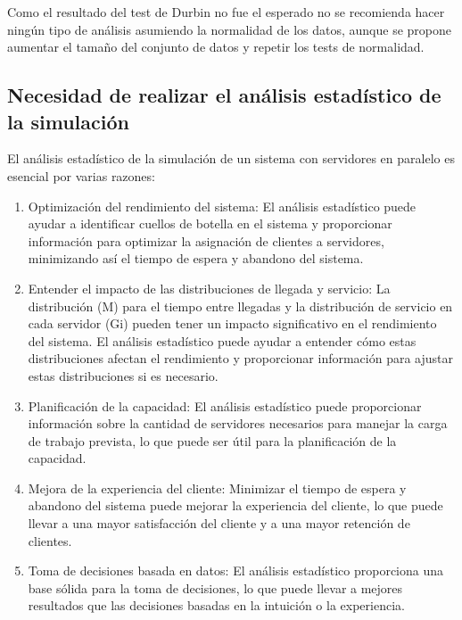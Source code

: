 \documentclass[12pt]{article}
\begin{document}
Como el resultado del test de Durbin no fue el esperado no se recomienda hacer ningún tipo de análisis asumiendo la normalidad de los datos, aunque se propone aumentar el tamaño del conjunto de datos y repetir los tests de normalidad.

\subsection{Necesidad de realizar el análisis estadístico de la simulación}
El análisis estadístico de la simulación de un sistema con servidores en paralelo es esencial por varias razones:
\begin{enumerate}
\item Optimización del rendimiento del sistema: El análisis estadístico puede ayudar a identificar cuellos de botella en el sistema y proporcionar información para optimizar la asignación de clientes a servidores, minimizando así el tiempo de espera y abandono del sistema.
\item Entender el impacto de las distribuciones de llegada y servicio: La distribución (M) para el tiempo entre llegadas y la distribución de servicio en cada servidor (Gi) pueden tener un impacto significativo en el rendimiento del sistema. El análisis estadístico puede ayudar a entender cómo estas distribuciones afectan el rendimiento y proporcionar información para ajustar estas distribuciones si es necesario.
\item Planificación de la capacidad: El análisis estadístico puede proporcionar información sobre la cantidad de servidores necesarios para manejar la carga de trabajo prevista, lo que puede ser útil para la planificación de la capacidad.
\item Mejora de la experiencia del cliente: Minimizar el tiempo de espera y abandono del sistema puede mejorar la experiencia del cliente, lo que puede llevar a una mayor satisfacción del cliente y a una mayor retención de clientes.
\item Toma de decisiones basada en datos: El análisis estadístico proporciona una base sólida para la toma de decisiones, lo que puede llevar a mejores resultados que las decisiones basadas en la intuición o la experiencia.
\end{enumerate}
\end{document}
